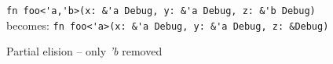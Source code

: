 \begin{figure}[h]
{\verb|fn foo<'a,'b>(x: &'a Debug, y: &'a Debug, z: &'b Debug)|}\newline
becomes:\newline
{\verb|fn foo<'a>(x: &'a Debug, y: &'a Debug, z: &Debug)|}
\caption{Partial elision -- only \emph{'b} removed}
\label{Fig:partial}
\end{figure}

